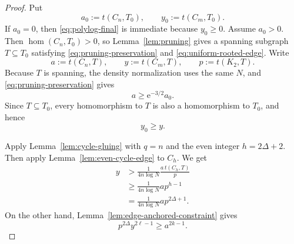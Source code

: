 \documentclass[11pt]{article}
\newcommand{\homn}{\operatorname{hom}}
\newcommand{\1}{\mathbf{1}}
\newcommand{\e}{\mathrm{e}}
\begin{document}
\begin{proof}
Put
\[
  a_0:=t(C_n,T_0),
  \qquad
  y_0:=t(C_m,T_0).
\]
If $a_0=0$, then \eqref{eq:polylog-final} is immediate because $y_0\ge0$.
Assume $a_0>0$.  Then $\homn(C_n,T_0)>0$, so
Lemma~\ref{lem:pruning} gives a spanning subgraph $T\subseteq T_0$ satisfying
\eqref{eq:pruning-preservation} and
\eqref{eq:uniform-rooted-edge}.  Write
\[
  a:=t(C_n,T),
  \qquad
  y:=t(C_m,T),
  \qquad
  p:=t(K_2,T).
\]
Because $T$ is spanning, the density normalization uses the same $N$, and
\eqref{eq:pruning-preservation} gives
\[
  a\ge \e^{-3/2}a_0.
  \tag{7.18}\label{eq:a-preserved}
\]
Since $T\subseteq T_0$, every homomorphism to $T$ is also a homomorphism to
$T_0$, and hence
\[
  y_0\ge y.
  \tag{7.19}\label{eq:y-monotone}
\]

Apply Lemma~\ref{lem:cycle-gluing} with $q=n$ and the even integer
$h=2\Delta+2$.  Then apply Lemma~\ref{lem:even-cycle-edge} to $C_h$.  We get
\[
\begin{aligned}
  y
  &>\frac{1}{4n\log N}
      \frac{a\,t(C_h,T)}{p}\\
  &\ge\frac{1}{4n\log N}a p^{h-1}\\
  &=\frac{1}{4n\log N}a p^{2\Delta+1}.
\end{aligned}
\tag{7.20}\label{eq:pruned-lower}
\]
On the other hand, Lemma~\ref{lem:edge-anchored-constraint} gives
\[
  p^{2\Delta}y^{2\ell-1}\ge a^{2k-1}.
  \tag{7.21}\label{eq:exact-constraint-repeated}
\]


\end{proof}
\end{document}
